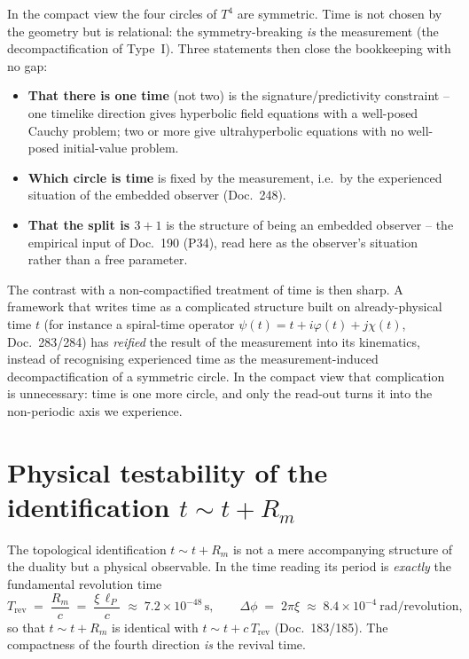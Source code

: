 \begin{principle}
In the compact view the four circles of $T^4$ are symmetric. Time is not chosen by
the geometry but is relational: the symmetry-breaking \emph{is} the measurement (the
decompactification of Type~I). Three statements then close the bookkeeping with no gap:
\begin{itemize}
  \item \textbf{That there is one time} (not two) is the signature/predictivity
  constraint -- one timelike direction gives hyperbolic field equations with a
  well-posed Cauchy problem; two or more give ultrahyperbolic equations with no
  well-posed initial-value problem.
  \item \textbf{Which circle is time} is fixed by the measurement, i.e.\ by the
  experienced situation of the embedded observer (Doc.~248).
  \item \textbf{That the split is $3{+}1$} is the structure of being an embedded
  observer -- the empirical input of Doc.~190 (P34), read here as the observer's
  situation rather than a free parameter.
\end{itemize}
\end{principle}

The contrast with a non-compactified treatment of time is then sharp. A framework
that writes time as a complicated structure built on already-physical time $t$ (for
instance a spiral-time operator $\psi(t)=t+i\varphi(t)+j\chi(t)$, Doc.~283/284) has
\emph{reified} the result of the measurement into its kinematics, instead of
recognising experienced time as the measurement-induced decompactification of a
symmetric circle. In the compact view that complication is unnecessary: time is one
more circle, and only the read-out turns it into the non-periodic axis we experience.

\section{Physical testability of the identification $t\sim t+R_m$}

The topological identification $t \sim t + R_m$ is not a mere accompanying
structure of the duality but a physical observable. In the time reading its
period is \emph{exactly} the fundamental revolution time
\[
  T_\text{rev} \;=\; \frac{R_m}{c} \;=\; \frac{\xi\,\ell_P}{c}
  \;\approx\; 7.2\times10^{-48}\,\text{s},
  \qquad
  \Delta\phi \;=\; 2\pi\xi \;\approx\; 8.4\times10^{-4}\ \text{rad/revolution},
\]
so that $t\sim t+R_m$ is identical with $t\sim t+c\,T_\text{rev}$ (Doc.~183/185).
The compactness of the fourth direction \emph{is} the revival time.


